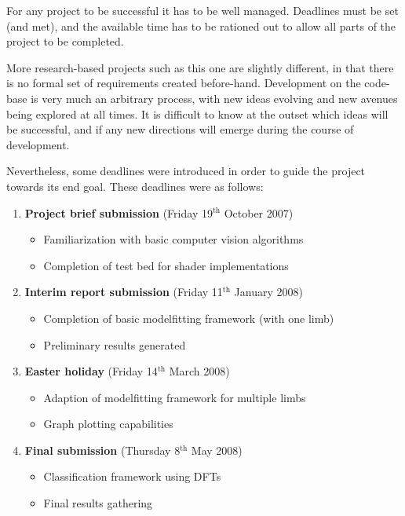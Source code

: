 For any project to be successful it has to be well managed.
Deadlines must be set (and met), and the available time has to be rationed out to allow all parts of the project to be completed.

More research-based projects such as this one are slightly different, in that there is no formal set of requirements created before-hand.
Development on the code-base is very much an arbitrary process, with new ideas evolving and new avenues being explored at all times.
It is difficult to know at the outset which ideas will be successful, and if any new directions will emerge during the course of development.

Nevertheless, some deadlines were introduced in order to guide the project towards its end goal.
These deadlines were as follows:

\begin{enumerate}
	\item \textbf{Project brief submission} (Friday 19$^\text{th}$ October 2007)
	\begin{itemize}
		\item Familiarization with basic computer vision algorithms
		\item Completion of test bed for shader implementations
	\end{itemize}
	
	\item \textbf{Interim report submission} (Friday 11$^\text{th}$ January 2008)
	\begin{itemize}
		\item Completion of basic modelfitting framework (with one limb)
		\item Preliminary results generated
	\end{itemize}
	
	\item \textbf{Easter holiday} (Friday 14$^\text{th}$ March 2008)
	\begin{itemize}
		\item Adaption of modelfitting framework for multiple limbs
		\item Graph plotting capabilities
	\end{itemize}
	
	\item \textbf{Final submission} (Thursday 8$^\text{th}$ May 2008)
	\begin{itemize}
		\item Classification framework using DFTs
		\item Final results gathering
	\end{itemize}
\end{enumerate}

